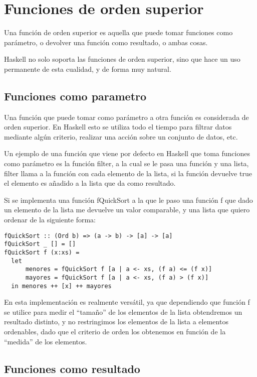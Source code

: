 
\section{Funciones de orden superior} %
\label{sec:functiones_de_orden_superior}


Una función de orden superior es aquella que puede tomar funciones como parámetro, o devolver una función como resultado, o ambas cosas.

Haskell no solo soporta las funciones de orden superior, sino que hace un uso permanente de esta cualidad, y de forma muy natural.


\subsection{Funciones como parametro} %
\label{sub:funciones_como_parametro}

Una función que puede tomar como parámetro a otra función es considerada de orden superior. En Haskell esto se utiliza todo el tiempo para filtrar datos mediante algún criterio, realizar una acción sobre un conjunto de datos, etc.

Un ejemplo de una función que viene por defecto en Haskell que toma funciones como parámetro es la función filter, a la cual se le pasa una función y una lista, filter llama a la función con cada elemento de la lista, si la función devuelve true el elemento es añadido a la lista que da como resultado.

Si se implementa una función fQuickSort a la que le paso una función f que dado un elemento de la lista me devuelve un valor comparable, y una lista que quiero ordenar de la siguiente forma:

\begin{lstlisting}
fQuickSort :: (Ord b) => (a -> b) -> [a] -> [a]
fQuickSort _ [] = []
fQuickSort f (x:xs) =
  let
      menores = fQuickSort f [a | a <- xs, (f a) <= (f x)]
      mayores = fQuickSort f [a | a <- xs, (f a) > (f x)]
  in menores ++ [x] ++ mayores
\end{lstlisting}

En esta implementación es realmente versátil, ya que dependiendo que función f se utilice para medir el “tamaño” de los elementos de la lista obtendremos un resultado distinto, y no restringimos los elementos de la lista a elementos ordenables, dado que el criterio de orden los obtenemos en función de la “medida” de los elementos.

\subsection{Funciones como resultado} %
\label{sub:funciones_como_resultado}

